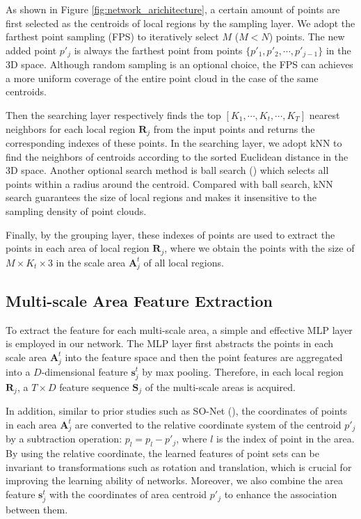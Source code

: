 \documentclass[letterpaper]{article}
\begin{document}
As shown in Figure \ref{fig:network_arichitecture},  a certain amount of points are first selected as the centroids of local regions by the sampling layer.
We adopt the farthest point sampling (FPS) to iteratively select $M$ ($M < N$) points. 
The new added point $p'_j$ is always the farthest point from points $\lbrace p'_1, p'_2, \cdots, p'_{j-1} \rbrace$ in the 3D space.
Although random sampling is an optional choice, the FPS can achieves a more uniform coverage of the entire point cloud in the case of the same centroids.

Then the searching layer respectively finds the top $[K_1,\cdots, K_t, \cdots,K_T]$ nearest neighbors for each local region $\bm{R}_j$ from the input points and returns the corresponding indexes of these points.
In the searching layer, we adopt kNN to find the neighbors of centroids according to the sorted Euclidean distance in the 3D space. 
Another optional search method is ball search (\citealt{qi2017pointnet++}) which selects  all points within a radius around the centroid.
Compared with ball search, kNN search guarantees the size of local regions and makes it insensitive to the sampling density of point clouds.

Finally, by the grouping layer, these indexes of points are used to extract the points in each area of local region $\bm{R}_j$, where we obtain the points with the size of $M \times K_t \times 3$ in the scale area $\bm{A}_j^t$ of all local regions.

\subsection{Multi-scale Area Feature Extraction}
To extract the feature for each multi-scale area, a simple and effective MLP layer is employed in our network.
The MLP layer first abstracts the points in each scale area $\bm{A}_j^t$ into the feature space and then the point features are aggregated into a $D$-dimensional feature $\bm{s}_j^t$ by max pooling.
Therefore, in each local region $\bm{R}_j$, a $T \times D$ feature sequence $\bm{S}_j$ of the multi-scale areas is acquired.





In addition, similar to prior studies such as SO-Net (\citealt{li2018so}), the coordinates of points in each area $\bm{A}_j^t$ are converted to the relative coordinate system of the centroid $p'_j$ by a subtraction operation: $p_{l} = p_{l} - p'_j$, where $l$ is the index of point in the area.
By using the relative coordinate, the learned features of point sets can be invariant to transformations such as rotation and translation, which is crucial for improving the learning ability of networks.
Moreover, we also combine the area feature $\bm{s}_j^t$ with the coordinates of area centroid $p'_j$ to enhance the association between them.
\end{document}
